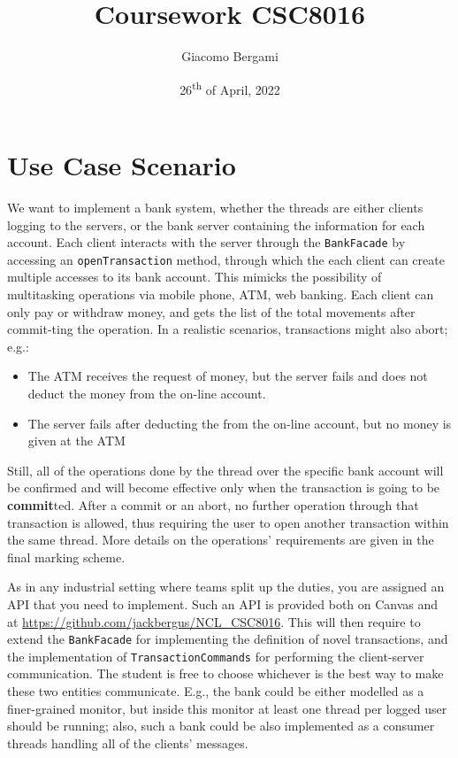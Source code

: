 \documentclass{article}
\title{Coursework CSC8016}
\author{Giacomo Bergami}
\date{26\textsuperscript{th} of April, 2022}
\begin{document}
	\maketitle
	
	\section*{Use Case Scenario}
We want to implement a bank system, whether the threads are
either clients logging to the servers, or the bank server containing
the information for each account. Each client interacts with the server through the \texttt{BankFacade} by accessing an \texttt{openTransaction} method, through which the each client can create multiple accesses to its bank account. This mimicks the possibility of multitasking operations via mobile phone, ATM, web banking. Each client can only \textsf{pay} or \textsf{withdraw} money, and gets the list of the total movements after \textsf{commit}-ting the operation. In a realistic scenarios, transactions might also \textsf{abort}; e.g.:
\begin{itemize}
\item The ATM receives the request of money, but the server fails and does
not deduct the money from the on-line account.
\item The server fails after deducting the from the on-line account, but no
money is given at the ATM
\end{itemize}
Still, all of the operations done by the thread over the specific bank account will be confirmed and will become effective only when the transaction is going to be \textbf{commit}ted. After a commit or an abort, no further operation through that transaction is allowed, thus requiring the user to open another transaction within the same thread. More details on the operations' requirements are given in the final marking scheme.


As in any industrial setting where teams split up the duties,
you are assigned an API that you need to implement. Such an API is provided both on Canvas and at \url{https://github.com/jackbergus/NCL_CSC8016}. This will then require to extend the \texttt{BankFacade} for implementing the definition of novel transactions, and the implementation of \texttt{TransactionCommands} for performing the client-server communication. The student is free to choose whichever is the best way to make these two entities communicate. E.g., the bank could be either modelled as a finer-grained monitor, but inside this monitor at least one thread per logged user should be running; also, such a bank could be also implemented as a consumer threads handling all of the clients' messages. 
	
\end{document}
